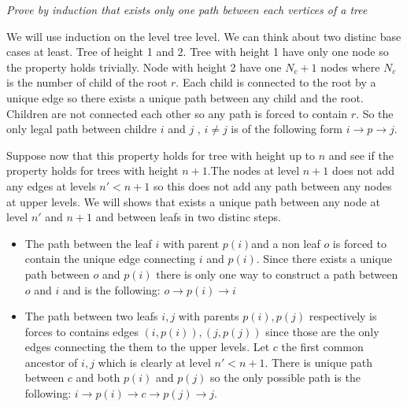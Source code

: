 \begin{problem}\textit{{Prove by induction that exists only one path between each vertices of a tree}}

\begin{solution}
We will use induction on the level tree level. We can think about two distinc base cases at least. Tree of height 1 and 2. Tree with height 1 have only one node so the property holds trivially. Node with height 2 have one $N_c+1$ nodes where $N_c$ is the number of child of the root $r$. Each child is connected to the root by a unique edge so there exists a unique path between any child and the root. Children are not connected each other so any path is forced to contain $r$. So the only legal path between childre $i$ and $j$ , $i \neq j$ is of the following form $i \rightarrow p \rightarrow j$.

Suppose now that this property holds for tree with height up to $n$ and see if the property holds for trees with height $n+1$.The nodes at level $n+1$ does not add any edges at levels $n' < n+1$ so this does not add any path between any nodes at upper levels. We will shows that exists a unique path between any node at level $n'$ and $n+1$ and between leafs in two distinc steps.
\begin{itemize}
\item The path between the leaf $i$ with parent $p(i)$and a non leaf $o$ is forced to contain the unique edge connecting $i$ and $p(i)$. Since there exists a unique path between $o$ and $p(i)$ there is only one way to construct a path between $o$ and $i$ and is the following: $o \rightarrow p(i) \rightarrow i$
\item The path between two leafs $i,j$ with parents $p(i),p(j)$ respectively is forces to contains edges $(i,p(i)),(j,p(j))$ since those are the only edges connecting the them to the upper levels. Let $c$ the first common ancestor of $i,j$ which is clearly at level $n'<n+1$. There is unique path between $c$ and both $p(i)$ and $p(j)$ so the only possible path is the following: $i \rightarrow p(i) \rightarrow c \rightarrow p(j) \rightarrow j$.
\end{itemize}
\end{solution}


\end{problem}


